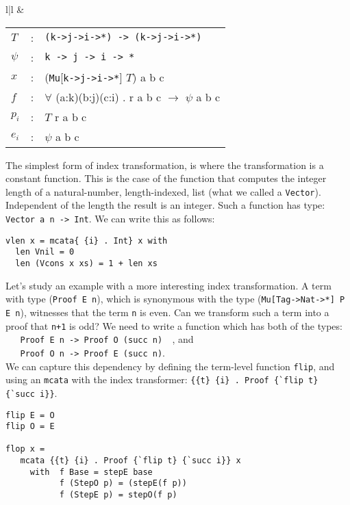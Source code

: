 {{\begin{tabular}{l|l}
&

\begin{minipage}[l]{.45\linewidth}
\begin{tabular}{lcl}
$T$ & : & \verb+(k->j->i->*) -> (k->j->i->*)+ \\
$\psi$ & : & \verb+k -> j -> i -> *+               \\ 
$x$ & : & (\verb+Mu+[\verb+k->j->i->*+] $T$) a b c        \\
$f$ & : & $\forall$ (a:k)(b:j)(c:i) . r a b c $\to$ $\psi$ a b c \\
$p_{i}$ & : & $T$ r a b c            \\
$e_{i}$ & : & $\psi$ a b c   \\
\end{tabular}
\end{minipage}
\end{tabular}
}  
\vspace*{0.05in}

The simplest form of index transformation, is where the transformation
is a constant function. This is the case of the function that computes
the integer length of a natural-number, length-indexed, list
(what we called a \verb+Vector+). Independent of the length the result
is an integer. Such a function has type: \verb+Vector a n -> Int+.
We can write this as follows:

{\small
\begin{verbatim}           
vlen x = mcata{ {i} . Int} x with
  len Vnil = 0
  len (Vcons x xs) = 1 + len xs
\end{verbatim}}


Let's study an example with a more interesting index transformation.
A term with type (\verb+Proof E n+), which is synonymous with the type 
(\verb+Mu[Tag->Nat->*] P E n+),  
witnesses that the term \verb+n+ is even. Can we transform such a term
into a proof that \verb!n+1! is odd? We need to write a function which
has both of the types:\\
\verb+   Proof E n -> Proof O (succ n)  +, and \\
\verb+   Proof O n -> Proof E (succ n)+. \\
We can capture this dependency
by defining the term-level function \verb+flip+, and using an \verb+mcata+
with the index transformer: \verb+{{t} {i} . Proof {`flip t} {`succ i}}+.

{\small
\begin{verbatim}
flip E = O
flip O = E

flop x = 
   mcata {{t} {i} . Proof {`flip t} {`succ i}} x    
     with  f Base = stepE base
           f (StepO p) = (stepE(f p))
           f (StepE p) = stepO(f p)
\end{verbatim}}


}
